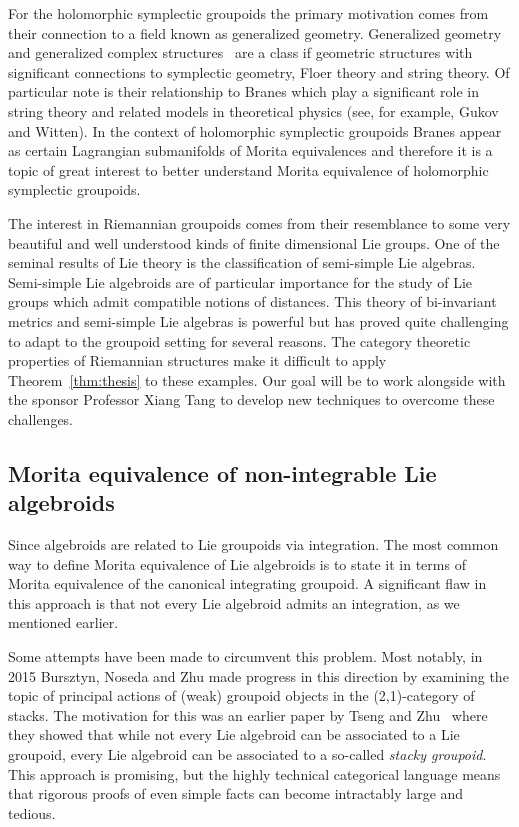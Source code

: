 \documentclass[11pt, letterpaper]{article}
\begin{document}
For the holomorphic symplectic groupoids the primary motivation comes from their connection to a field known as generalized geometry. Generalized geometry and generalized complex structures~\cite{Hitchin,GCGualt} are a class if geometric structures with significant connections to symplectic geometry, Floer theory and string theory. Of particular note is their relationship to Branes which play a significant role in string theory and related models in theoretical physics (see, for example, Gukov and Witten\cite{GukovWitten}). In the context of holomorphic symplectic groupoids Branes appear as certain Lagrangian submanifolds of Morita equivalences\cite{BigBraneGualt} and therefore it is a topic of great interest to better understand Morita equivalence of holomorphic symplectic groupoids.

The interest in Riemannian groupoids comes from their resemblance to some very beautiful and well understood kinds of finite dimensional Lie groups. One of the seminal results of Lie theory is the classification of semi-simple Lie algebras. Semi-simple Lie algebroids are of particular importance for the study of Lie groups which admit compatible notions of distances. This theory of bi-invariant metrics and semi-simple Lie algebras is powerful but has proved quite challenging to adapt to the groupoid setting for several reasons. The category theoretic properties of Riemannian structures make it difficult to apply Theorem~\ref{thm:thesis} to these examples. Our goal will be to work alongside with the sponsor Professor Xiang Tang to develop new techniques to overcome these challenges.
\subsection{Morita equivalence of non-integrable Lie algebroids}\label{proj:non.integrable}
Since algebroids are related to Lie groupoids via integration. The most common way to define Morita equivalence of Lie algebroids is to state it in terms of Morita equivalence of the canonical integrating groupoid. A significant flaw in this approach is that not every Lie algebroid admits an integration, as we mentioned earlier.

Some attempts have been made to circumvent this problem. Most notably, in 2015 \cite{BStacky} Bursztyn, Noseda and Zhu made progress in this direction by examining the topic of principal actions of (weak) groupoid objects in the (2,1)-category of stacks. The motivation for this was an earlier paper by Tseng and Zhu~\cite{IntViaStacks} where they showed that while not every Lie algebroid can be associated to a Lie groupoid, every Lie algebroid can be associated to a so-called \emph{stacky groupoid}. This approach is promising, but the highly technical categorical language means that rigorous proofs of even simple facts can become intractably large and tedious. 
\end{document}
